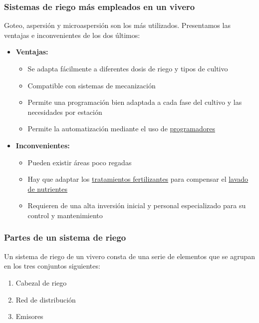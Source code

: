 \documentclass[a4paper,12pt,oneside]{article}
\begin{document}
\subsubsection{Sistemas de riego más empleados en un vivero}
\label{sec:orgec3d4a6}
Goteo, aspersión y microaspersión son los más utilizados. Presentamos las
ventajas e inconvenientes de los dos últimos:\\
\begin{itemize}
\item \textbf{Ventajas:}\\
\begin{itemize}
\item Se adapta fácilmente a diferentes dosis de riego y tipos de cultivo
\item Compatible con sistemas de mecanización
\item Permite una programación bien adaptada a cada fase del cultivo y las
necesidades por estación
\item Permite la automatización mediante el uso de \uline{programadores}
\end{itemize}
\item \textbf{Inconvenientes:}\\
\begin{itemize}
\item Pueden existir áreas poco regadas
\item Hay que adaptar los \uline{tratamientos fertilizantes}  para compensar el \uline{lavado
de nutrientes}
\item Requieren de una alta inversión inicial y personal especializado para su
control y mantenimiento
\end{itemize}
\end{itemize}
\subsubsection{Partes de un sistema de riego}
\label{sec:org7cd30f7}
Un sistema de riego de un vivero consta de una serie de elementos que se agrupan
en los tres conjuntos siguientes:\\
\begin{enumerate}
\item Cabezal de riego
\item Red de distribución
\item Emisores
\end{enumerate}
\end{document}
